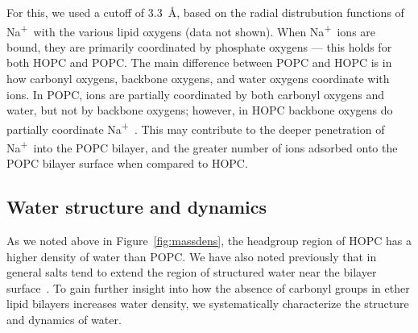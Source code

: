 \documentclass[12pt,openany,final]{book}
\newcommand{\na}{Na\textsuperscript{+}~}
\begin{document}
For this, we used a cutoff
of 3.3~\AA, based on the radial distrubution functions of \na with the
various lipid oxygens (data not shown). When \na ions are bound, they are primarily coordinated by 
phosphate oxygens --- this holds for both HOPC and POPC. The main difference between POPC and HOPC is 
in how carbonyl oxygens, backbone oxygens, and water oxygens coordinate with ions. In POPC, ions are partially 
coordinated by both carbonyl oxygens and water, but not by backbone oxygens; however, in HOPC backbone oxygens do partially coordinate \na. 
This may contribute to the deeper penetration of \na into the POPC bilayer, and the greater number of ions adsorbed onto the POPC
bilayer surface when compared to HOPC.

\subsection{Water structure and dynamics}
\label{sec:waterstruc}
As we noted above in Figure~\ref{fig:massdens}, the headgroup region of HOPC has a higher density of water than 
POPC. We have also noted previously that in 
general salts tend to extend the region of structured water near the bilayer surface~\cite{kruczek:2017}. 
To gain further insight into how the absence of carbonyl groups in ether lipid bilayers increases water density, we systematically characterize the structure and dynamics of water.  
\end{document}
